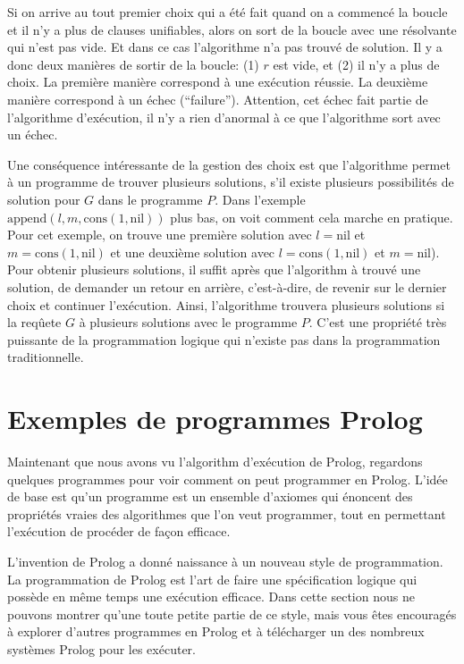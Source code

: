Si on arrive au tout premier choix qui a été fait quand on a commencé la boucle et il n'y a plus de clauses unifiables,
alors on sort de la boucle avec une résolvante qui n'est pas vide. Et dans ce cas l'algorithme n'a pas trouvé de solution. 
Il y a donc deux manières de sortir de la boucle: (1) $r$ est vide, et (2) il n'y a plus de choix.
La première manière correspond à une exécution réussie.
La deuxième manière correspond à un échec (``failure'').
Attention, cet échec fait partie de l'algorithme d'exécution, il n'y a rien d'anormal à ce que l'algorithme sort avec un échec.

Une conséquence intéressante de la gestion des choix est que
l'algorithme permet à un programme de trouver plusieurs solutions, s'il existe plusieurs possibilités
de solution pour $G$ dans le programme $P$.
Dans l'exemple $\mathrm{append}(l,m,\mathrm{cons}(1,\mathrm{nil}))$ plus bas,
on voit comment cela marche en pratique.
Pour cet exemple, on trouve une première solution avec $l=\mathrm{nil}$ et $m=\mathrm{cons}(1,\mathrm{nil})$ et une deuxième solution
avec $l=\mathrm{cons}(1,\mathrm{nil})$ et $m=\mathrm{nil}$).
Pour obtenir plusieurs solutions, il suffit après que l'algorithm à trouvé une solution,
de demander un retour en arrière, c'est-à-dire, de revenir sur le dernier choix et continuer l'exécution.
Ainsi, l'algorithme trouvera plusieurs solutions si la reqûete $G$ à plusieurs solutions avec le programme $P$.
C'est une propriété très puissante de la programmation logique qui n'existe pas dans la programmation traditionnelle.


\section{Exemples de programmes Prolog}

Maintenant que nous avons vu l'algorithm d'exécution de Prolog,
regardons quelques programmes pour voir comment on peut programmer en Prolog.
L'idée de base est qu'un programme est un ensemble d'axiomes qui énoncent des propriétés vraies
des algorithmes que l'on veut programmer, tout en permettant l'exécution de procéder de façon efficace.

L'invention de Prolog a donné naissance à un nouveau style de programmation.
La programmation de Prolog est l'art de faire une spécification logique qui possède en même temps une exécution efficace.
Dans cette section nous ne pouvons montrer qu'une toute petite partie de ce style,
mais vous êtes encouragés à explorer d'autres programmes en Prolog et à télécharger
un des nombreux systèmes Prolog pour les exécuter.

